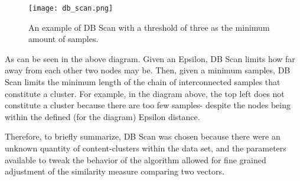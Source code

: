 \begin{figure}[H]
  \centering
  \texttt{[image: db\_scan.png]}
  \caption{An example of DB Scan with a threshold of three as the minimum amount of samples.}
\end{figure}

As can be seen in the above diagram. Given an Epsilon, DB Scan limits
how far away from each other two nodes may be. Then, given a minimum
samples, DB Scan limits the minimum length of the chain of
interconnected samples that constitute a cluster. For example, in the
diagram above, the top left does not constitute a cluster because
there are too few samples- despite the nodes being within the defined
(for the diagram) Epsilon distance.

Therefore, to briefly summarize, DB Scan was chosen because there were
an unknown quantity of content-clusters within the data set, and the
parameters available to tweak the behavior of the algorithm allowed
for fine grained adjustment of the similarity measure comparing two
vectors.
